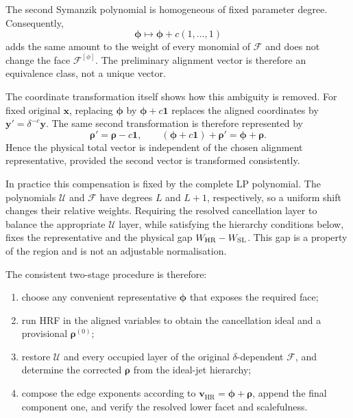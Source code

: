 \documentclass[a4paper,11pt]{article}
\newcommand{\x}{\boldsymbol{x}}
\newcommand{\HR}{\mathrm{HR}}
\newcommand{\WSL}{W_{\rm SL}}
\newcommand{\WHR}{W_{\rm HR}}
\begin{document}
The second Symanzik polynomial is homogeneous of fixed parameter degree.
Consequently,
\begin{equation}
 \boldsymbol\phi\longmapsto
 \boldsymbol\phi+c(1,\ldots,1)
\label{eq:uniformshift}
\end{equation}
adds the same amount to the weight of every monomial of \(\mathcal F\) and
does not change the face \(\mathcal F^{[\phi]}\).  The preliminary alignment
vector is therefore an equivalence class, not a unique vector.

The coordinate transformation itself shows how this ambiguity is removed.
For fixed original \(\x\), replacing
\(\boldsymbol\phi\) by \(\boldsymbol\phi+c\boldsymbol1\) replaces the aligned
coordinates by \(\boldsymbol y'=\delta^{-c}\boldsymbol y\).  The same second
transformation is therefore represented by
\begin{equation}
 \boldsymbol\rho' = \boldsymbol\rho-c\boldsymbol1,
 \qquad
 (\boldsymbol\phi+c\boldsymbol1)+\boldsymbol\rho'
 =\boldsymbol\phi+\boldsymbol\rho.
 \label{eq:shift-covariant-composition}
\end{equation}
Hence the physical total vector is independent of the chosen alignment
representative, provided the second vector is transformed consistently.

In practice this compensation is fixed by the complete LP polynomial.
The polynomials \(\mathcal U\) and \(\mathcal F\) have degrees \(L\) and
\(L+1\), respectively, so a uniform shift changes their relative weights.
Requiring the resolved cancellation layer to balance the appropriate
\(\mathcal U\) layer, while satisfying the hierarchy conditions below, fixes
the representative and the physical gap \(\WHR-\WSL\).  This gap is a
property of the region and is not an adjustable normalisation.

The consistent two-stage procedure is therefore:
\begin{enumerate}[label=(\roman*)]
 \item choose any convenient representative \(\boldsymbol\phi\) that exposes
 the required face;
 \item run HRF in the aligned variables to obtain the cancellation ideal and
 a provisional \(\boldsymbol\rho^{(0)}\);
 \item restore \(\mathcal U\) and every occupied layer of the original
 \(\delta\)-dependent \(\mathcal F\), and determine the corrected
 \(\boldsymbol\rho\) from the ideal-jet hierarchy;
 \item compose the edge exponents according to
 \(\boldsymbol v_{\HR}=\boldsymbol\phi+\boldsymbol\rho\), append the final
 component one, and verify the resolved lower facet and scalefulness.
\end{enumerate}
\end{document}
